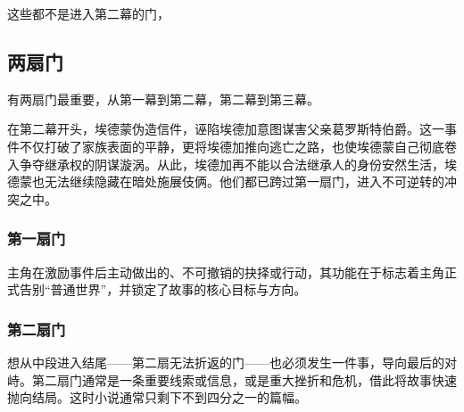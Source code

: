 \documentclass[11pt, twoside, hidelinks]{memoir}
\begin{document}
这些都不是进入第二幕的门，
\subsection{两扇门}
\label{sec:org85148d4}
有两扇门最重要，从第一幕到第二幕，第二幕到第三幕。

在第二幕开头，埃德蒙伪造信件，诬陷埃德加意图谋害父亲葛罗斯特伯爵。这一事件不仅打破了家族表面的平静，更将埃德加推向逃亡之路，也使埃德蒙自己彻底卷入争夺继承权的阴谋漩涡。从此，埃德加再不能以合法继承人的身份安然生活，埃德蒙也无法继续隐藏在暗处施展伎俩。他们都已跨过第一扇门，进入不可逆转的冲突之中。
\subsubsection{第一扇门}
\label{sec:org2377ad0}
主角在激励事件后主动做出的、不可撤销的抉择或行动，其功能在于标志着主角正式告别“普通世界”，并锁定了故事的核心目标与方向。
\subsubsection{第二扇门}
\label{sec:org6136eca}
想从中段进入结尾——第二扇无法折返的门——也必须发生一件事，导向最后的对峙。第二扇门通常是一条重要线索或信息，或是重大挫折和危机，借此将故事快速抛向结局。这时小说通常只剩下不到四分之一的篇幅。
\end{document}
